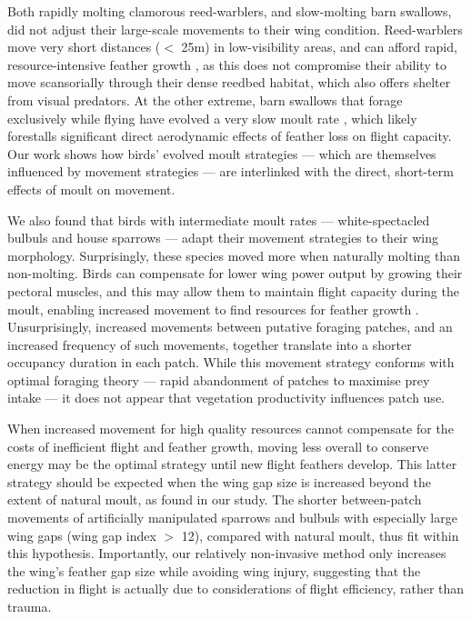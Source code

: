 Both rapidly molting clamorous reed-warblers, and slow-molting barn swallows, did not adjust their large-scale movements to their wing condition.
Reed-warblers move very short distances ($<$ 25m) in low-visibility areas, and can afford rapid, resource-intensive feather growth \citep{lindstrom1993,newton2009,kiat2017}, as this does not compromise their ability to move scansorially through their dense reedbed habitat, which also offers shelter from visual predators.
At the other extreme, barn swallows that forage exclusively while flying have evolved a very slow moult rate \parencite{kiat2016}, which likely forestalls significant direct aerodynamic effects of feather loss on flight capacity.
Our work shows how birds' evolved moult strategies --- which are themselves influenced by movement strategies \parencite{kiat2016} --- are interlinked with the direct, short-term effects of moult on movement.

We also found that birds with intermediate moult rates --- white-spectacled bulbuls and house sparrows --- adapt their movement strategies to their wing morphology.
Surprisingly, these species moved more when naturally molting than non-molting.
Birds can compensate for lower wing power output by growing their pectoral muscles, and this may allow them to maintain flight capacity during the moult, enabling increased movement to find resources for feather growth \parencite{chai1997,swaddle1997}.
Unsurprisingly, increased movements between putative foraging patches, and an increased frequency of such movements, together translate into a shorter occupancy duration in each patch.
While this movement strategy conforms with optimal foraging theory --- rapid abandonment of patches to maximise prey intake \parencite{charnov1976} --- it does not appear that vegetation productivity influences patch use.

When increased movement for high quality resources \parencite{charnov1976} cannot compensate for the costs of inefficient flight and feather growth, moving less overall to conserve energy may be the optimal strategy until new flight feathers develop.
This latter strategy should be expected when the wing gap size is increased beyond the extent of natural moult, as found in our study.
The shorter between-patch movements of artificially manipulated sparrows and bulbuls with especially large wing gaps (wing gap index $>$ 12), compared with natural moult, thus fit within this hypothesis.
Importantly, our relatively non-invasive method only increases the wing's feather gap size while avoiding wing injury, suggesting that the reduction in flight is actually due to considerations of flight efficiency, rather than trauma.

